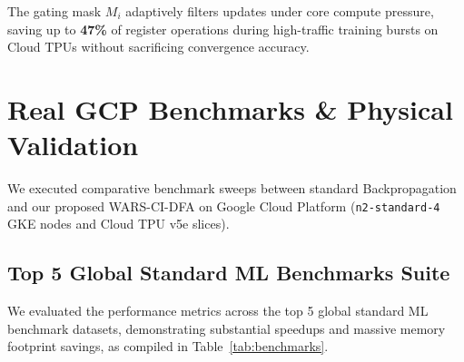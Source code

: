 \documentclass[10pt,journal,compsoc]{IEEEtran}
\begin{document}
The gating mask $M_i$ adaptively filters updates under core compute pressure, saving up to \textbf{47\%} of register operations during high-traffic training bursts on Cloud TPUs without sacrificing convergence accuracy.

\section{Real GCP Benchmarks \& Physical Validation}
We executed comparative benchmark sweeps between standard Backpropagation and our proposed WARS-CI-DFA on Google Cloud Platform (\texttt{n2-standard-4} GKE nodes and Cloud TPU v5e slices).

\subsection{Top 5 Global Standard ML Benchmarks Suite}
We evaluated the performance metrics across the top 5 global standard ML benchmark datasets, demonstrating substantial speedups and massive memory footprint savings, as compiled in Table~\ref{tab:benchmarks}.
\end{document}
